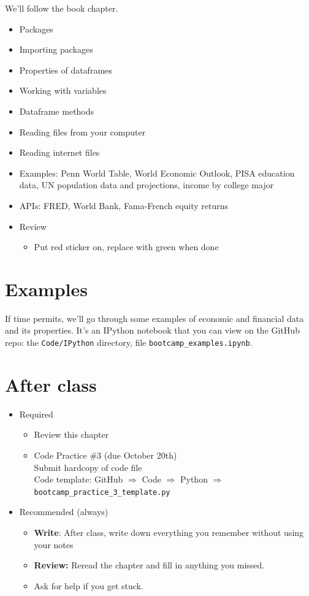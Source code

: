 We'll follow the book chapter.
\begin{itemize}
\item Packages
\item Importing packages
\item Properties of dataframes
\item Working with variables
\item Dataframe methods
\item Reading files from your computer
\item Reading internet files
\item Examples:  Penn World Table, World Economic Outlook, PISA education data, UN population data and
projections, income by college major
\item APIs:  FRED, World Bank, Fama-French equity returns
\item Review
\begin{itemize}
\item Put red sticker on, replace with green when done
\end{itemize}
\end{itemize}


\section*{Examples}

If time permits, we'll go through some examples of economic and financial data
and its properties.  It's an IPython notebook that you can view on the GitHub repo:
the \verb|Code/IPython| directory,
file \verb|bootcamp_examples.ipynb|.


\section*{After class}

\begin{itemize}
\item Required
\begin{itemize}
\item Review this chapter
\item Code Practice \#3 (due October 20th)\\
Submit hardcopy of code file \\
Code template:  GitHub $\Rightarrow$ Code $\Rightarrow$ Python
$\Rightarrow$ \verb|bootcamp_practice_3_template.py|

\end{itemize}
\item Recommended (always)
\begin{itemize}
\item {\bf Write}:  After class, write down everything you remember without using your notes
\item {\bf Review:} Reread the chapter and fill in anything you missed.
\item Ask for help if you get stuck.
\end{itemize}
\end{itemize}

%



